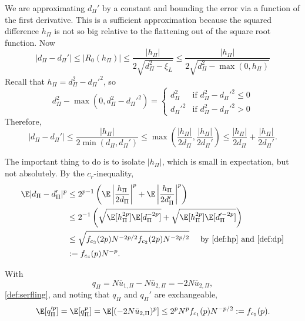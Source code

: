 We are approximating $d_{\Pi}'$ by a constant and bounding the error via a function of the first
derivative.  This is a sufficient approximation because the squared difference $h_{\Pi}$ is not so
big relative to the flattening out of the square root function.
Now
\begin{equation*}
  |d_{\Pi}-d_{\Pi}'| \leq |R_0(h_{\Pi})| \leq \frac{|h_{\Pi}|}{2\sqrt{d_{\Pi}^2-\xi_L}} \leq
  \frac{|h_{\Pi}|}{2\sqrt{d_{\Pi}^2-\max(0, h_{\Pi})}}
\end{equation*}
Recall that $h_{\Pi} = d_{\Pi}^2 - d_{\Pi}'^2$, so
\begin{equation*}
  d_{\Pi}^2-\max(0, d_{\Pi}^2-d_{\Pi}'^2) =
  \begin{cases}
    d_{\Pi}^2 & \text{if } d_{\Pi}^2-d_{\Pi}'^2 \leq 0 \\
    d_{\Pi}'^2 & \text{if } d_{\Pi}^2-d_{\Pi}'^2 > 0
  \end{cases}
\end{equation*}
Therefore,
\begin{equation*}
  |d_{\Pi}-d_{\Pi}'| \leq \frac{|h_{\Pi}|}{2\min(d_{\Pi}, d_{\Pi}')} \leq \max \left (
    \frac{|h_{\Pi}|}{2d_{\Pi}}, \frac{|h_{\Pi}|}{2d_{\Pi}'} \right ) \leq
  \frac{|h_{\Pi}|}{2d_{\Pi}} +  \frac{|h_{\Pi}|}{2d_{\Pi}'}.
\end{equation*}

The important thing to do is to isolate $|h_{\Pi}|$, which is small in
expectation, but not absolutely.  By the $c_r$-inequality,
\begin{align}
  \E |d_{\Pi}-d_{\Pi}'|^p
  &\leq 2^{p-1} \left ( \E \left | \frac{h_{\Pi}}{2d_{\Pi}} \right |^p + \E \left |
      \frac{h_{\Pi}}{2d_{\Pi}'} \right |^p \right ) \nonumber \\
  &\leq 2^{-1} \left ( \sqrt{\E[h_{\Pi}^{2p}]\E[d_{\Pi}^{-2p}]} +
  \sqrt{\E[h_{\Pi}^{2p}]\E[d_{\Pi}'^{-2p}]} \right ) \nonumber \\
  &\leq \sqrt{f_{c_3}(2p)N^{-2p/2} f_{c_2}(2p) N^{-2p/2}} \quad \text{ by } \eqref{def:hp}
  \text{ and } \eqref{def:dp} \nonumber \\
  &:= f_{c_4}(p) N^{-p} \label{def:ddiffp}.
\end{align}

With
\begin{equation}
  \label{eq:qpi}
  q_{\Pi} = N\bar{u}_{1,\Pi} - N\bar{u}_{2,\Pi} = -2N\bar{u}_{2,\Pi},
\end{equation}
\eqref{def:serfling}, and noting that $q_{\Pi}$ and $q_{\Pi}'$ are exchangeable,
\begin{equation}
\label{def:qp}
  \E[q_{\Pi}'^p] = \E[q_{\Pi}^p] = \E[(-2N\bar{u}_{2,\Pi})^p]
  \leq 2^pN^p f_{c_1}(p)N^{-p/2} := f_{c_5}(p).
\end{equation}

